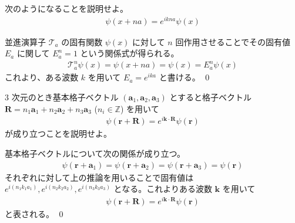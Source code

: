 \documentclass[uplatex,dvipdfmx,a4paper,11pt]{jlreq}
\makeatletter
\newcommand{\ZZ}{\mathbb{Z}}
\newcommand{\rr}{\bm{r}}
\newcommand{\kk}{\bm{k}}
\numberwithin{equation}{section}
\theoremstyle{definition}
\renewenvironment{proof}[1][\proofname]{\par
  \normalfont
  \topsep6\p@\@plus6\p@ \trivlist
  \item[\hskip\labelsep{\bfseries #1}\@addpunct{\bfseries}]\ignorespaces\quad\par
}{%
  \qed\endtrivlist\@endpefalse
}
\renewcommand\proofname{証明}
\makeatother
\begin{document}
\begin{problem}
次のようになることを説明せよ。
\begin{align}
  \psi(x + na) = e^{ikna}\psi(x)
\end{align}
\end{problem}
\begin{proof}
  並進演算子 $\mathcal{T}_a$ の固有関数 $\psi(x)$ に対して $n$ 回作用させることでその固有値 $E_a$ に関して $E_a^n = 1$ という関係式が得られる。
  \begin{align}
    \mathcal{T}_a^n\psi(x) = \psi(x + na) = \psi(x) = E_a^n\psi(x)
  \end{align}
  これより、ある波数 $k$ を用いて $E_a = e^{ika}$ と書ける。
\end{proof}

\begin{problem}
3 次元のとき基本格子ベクトル $(\bm{a}_1, \bm{a}_2, \bm{a}_3)$ とすると格子ベクトル $\bm{R} = n_1\bm{a}_1 + n_2\bm{a}_2 + n_3\bm{a}_3$ ($n_i\in\ZZ$) を用いて
\begin{align}
  \psi(\rr + \bm{R}) = e^{i\kk\cdot\bm{R}}\psi(\rr)
\end{align}
が成り立つことを説明せよ。
\end{problem}
\begin{proof}
  基本格子ベクトルについて次の関係が成り立つ。
  \begin{align}
    \psi(\rr + \bm{a}_1) = \psi(\rr + \bm{a}_2) = \psi(\rr + \bm{a}_3) = \psi(\rr)
  \end{align}
  それぞれに対して上の推論を用いることで固有値は $e^{i(n_1k_1a_1)}, e^{i(n_2k_2a_2)}, e^{i(n_3k_3a_3)}$ となる。これよりある波数 $\kk$ を用いて
  \begin{align}
    \psi(\rr + \bm{R}) = e^{i\kk\cdot\bm{R}}\psi(\rr)
  \end{align}
  と表される。
\end{proof}
\end{document}
